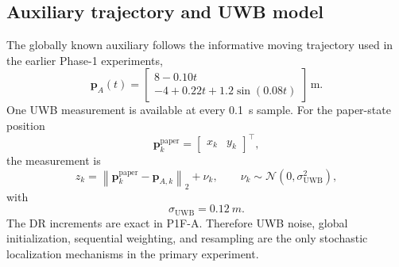 \subsection{Auxiliary trajectory and UWB model}
The globally known auxiliary follows the informative moving trajectory used in the earlier Phase-1 experiments,
\begin{equation}
    \bm p_A(t)=
    \begin{bmatrix}
        8-0.10t\\
        -4+0.22t+1.2\sin(0.08t)
    \end{bmatrix}\,\mathrm{m}.
\end{equation}
One UWB measurement is available at every \SI{0.1}{s} sample. For the paper-state position
\begin{equation}
    \bm p_k^{\mathrm{paper}}=\begin{bmatrix}x_k&y_k\end{bmatrix}^{\top},
\end{equation}
the measurement is
\begin{equation}
    z_k
    =\left\lVert\bm p_k^{\mathrm{paper}}-\bm p_{A,k}\right\rVert_2+\nu_k,
    \qquad
    \nu_k\sim\mathcal N(0,\sigma_{\mathrm{UWB}}^2),
\end{equation}
with
\begin{equation}
    \sigma_{\mathrm{UWB}}=\SI{0.12}{m}.
\end{equation}
The DR increments are exact in P1F-A. Therefore UWB noise, global initialization, sequential weighting, and resampling are the only stochastic localization mechanisms in the primary experiment.

